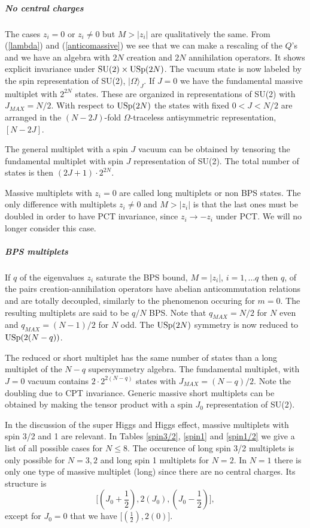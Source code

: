 \documentclass[a4paper,12pt]{article}
\begin{document}
\subparagraph{No central charges} The cases   $z_i=0$ or $z_i\neq
0$ but  $M>|z_i|$ are qualitatively the same.
 From (\ref{lambda}) and (\ref{anticomassive}) we see that we can make a rescaling of the $Q$'s and
  we have an algebra with $2N$ creation and $2N$ annihilation operators. It shows explicit invariance
  under $\mathrm{SU}(2)\times\mathrm{USp}(2N)$. The vacuum state is now labeled by the spin representation of SU(2),
   $|\Omega\rangle_J$. If $J=0$ we have the fundamental massive multiplet with $2^{2N}$ states. These
   are organized in  representations of SU(2) with $J_{MAX}=N/2$. With respect to $\mathrm{USp}(2N)$ the states
   with fixed $0<J<N/2$ are arranged in the $(N-2J)$-fold $\Omega$-traceless antisymmetric representation,
    $[N-2J]$.

The general multiplet with a spin $J$  vacuum can  be obtained by tensoring the fundamental multiplet
 with spin $J$ representation of SU(2). The total number of states is then $(2J+1)\cdot2^{2N}$.

Massive multiplets with $z_i=0$ are called long multiplets or non BPS states. The only difference with
multiplets $z_i\neq 0$ and $M>|z_i|$ is that the last ones must be doubled in order to have PCT invariance,
since $z_i\rightarrow -z_i$ under PCT. We will no longer  consider this case.



\subparagraph{BPS multiplets} If $q$ of the eigenvalues $z_i$
saturate the BPS bound, $M=|z_i|$, $i=1,\dots q$ then $q$, of the
pairs creation-annihilation operators have abelian anticommutation
relations and are totally decoupled, similarly to the phenomenon
occuring for $m=0$. The resulting multiplets are said to be $q/N$
BPS. Note that $q_{MAX}=N/2$ for $N$ even and $q_{MAX}=(N-1)/2$
for $N$ odd. The $\mathrm{USp}(2N)$ symmetry is now reduced to
$\mathrm{USp}(2(N-q))$.

The reduced or short multiplet has the same number of states than a long multiplet of the $N-q$
supersymmetry algebra. The fundamental multiplet, with $J=0$ vacuum  contains $2\cdot2^{2(N-q)}$
 states with $J_{MAX}=(N-q)/2$. Note the doubling due to CPT invariance.
 Generic massive short multiplets can be obtained by making the tensor product
 with a spin $J_0$ representation of SU(2).

\bigskip

In the discussion of the super Higgs and Higgs  effect, massive multiplets with spin 3/2 and 1 are
 relevant. In Tables \ref{spin3/2}, \ref{spin1} and \ref{spin1/2} we give a list of all possible
  cases for $N\leq 8$. The occurence of long spin 3/2 multiplets is only possible for $N=3,2$ and long spin
   1 multiplets for $N=2$. In $N=1$ there is only one type of massive multiplet (long) since there are
    no central charges. Its structure is
$$\bigl[(J_0+\frac{1}{2}),2(J_0),(J_0-\frac{1}{2})\bigr],$$ except
for $J_0=0$ that we have
 $\bigl[(\frac{1}{2}),2(0)\bigr]$.
\end{document}
